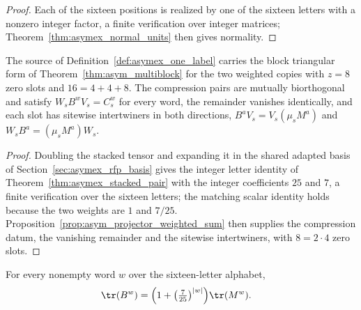 \begin{proof}
    \leanok
    Each of the sixteen positions is realized by one of the sixteen letters
    with a nonzero integer factor, a finite verification over integer
    matrices; Theorem~\ref{thm:asymex_normal_units} then gives normality.
\end{proof}

\begin{theorem}
    \label{thm:asymex_one_label_compression}
    \leanok
    The source of Definition~\ref{def:asymex_one_label} carries the block
    triangular form of Theorem~\ref{thm:asym_multiblock} for the two
    weighted copies with $z=8$ zero slots and $16=4+4+8$. The compression
    pairs are mutually biorthogonal and satisfy $W_sB^wV_s=C_s^w$ for every
    word, the remainder vanishes identically, and each slot has sitewise
    intertwiners in both directions, $B^aV_s=V_s(\mu_sM^a)$ and
    $W_sB^a=(\mu_sM^a)W_s$.
\end{theorem}

\begin{proof}
    \leanok
    Doubling the stacked tensor and expanding it in the shared adapted
    basis of Section~\ref{sec:asymex_rfp_basis} gives the integer letter
    identity of Theorem~\ref{thm:asymex_stacked_pair} with the integer
    coefficients $25$ and $7$, a finite verification over the sixteen
    letters; the matching scalar identity holds because the two weights are
    $1$ and $7/25$. Proposition~\ref{prop:asym_projector_weighted_sum} then
    supplies the compression datum, the vanishing remainder and the sitewise
    intertwiners, with $8=2\cdot4$ zero slots.
\end{proof}

\begin{theorem}
    \label{thm:asymex_one_label_trace}
    \leanok
    For every nonempty word $w$ over the sixteen-letter alphabet,
    \begin{align}
        \tr(B^w) & =\Bigl(1+\bigl(\tfrac{7}{25}\bigr)^{|w|}\Bigr)\tr(M^w).
        \label{eq:asymex_one_label_trace}
    \end{align}
\end{theorem}

